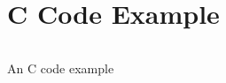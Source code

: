 \section{C Code Example}

\begin{code}
    \inputminted[frame=leftline, fontsize=\footnotesize, linenos, breaklines]{c}{Code/example.c}
    \caption[An C Code Example]{An C code example}
\end{code}